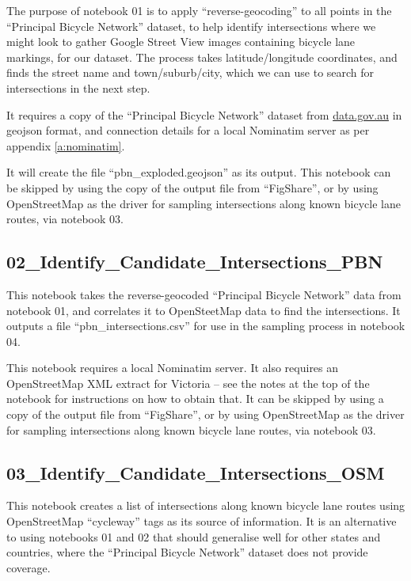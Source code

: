 \documentclass[11pt,twoside]{report}
\begin{document}
The purpose of notebook 01 is to apply ``reverse-geocoding'' to all points in the ``Principal Bicycle Network'' dataset, to help identify intersections where we might look to gather Google Street View images containing bicycle lane markings, for our dataset.  The process takes latitude/longitude coordinates, and finds the street name and town/suburb/city, which we can use to search for intersections in the next step.

It requires a copy of the ``Principal Bicycle Network'' dataset from \url{data.gov.au} in geojson format, and connection details for a local Nominatim server as per appendix \ref{a:nominatim}.

It will create the file ``pbn\_exploded.geojson'' as its output.  This notebook can be skipped by using the copy of the output file from ``FigShare'', or by using OpenStreetMap as the driver for sampling intersections along known bicycle lane routes, via notebook 03.


\subsection{02\_Identify\_Candidate\_Intersections\_PBN}
\label{aj02}

This notebook takes the reverse-geocoded ``Principal Bicycle Network'' data from notebook 01, and correlates it to OpenSteetMap data to find the intersections.  It outputs a file ``pbn\_intersections.csv'' for use in the sampling process in notebook 04.

This notebook requires a local Nominatim server.  It also requires an OpenStreetMap XML extract for Victoria -- see the notes at the top of the notebook for instructions on how to obtain that.  It can be skipped by using a copy of the output file from ``FigShare'', or by using OpenStreetMap as the driver for sampling intersections along known bicycle lane routes, via notebook 03.


\subsection{03\_Identify\_Candidate\_Intersections\_OSM}
\label{aj03}

This notebook creates a list of intersections along known bicycle lane routes using OpenStreetMap ``cycleway'' tags as its source of information.  It is an alternative to using notebooks 01 and 02 that should generalise well for other states and countries, where the ``Principal Bicycle Network'' dataset does not provide coverage.
\end{document}
